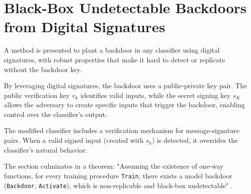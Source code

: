 \documentclass[
	fontsize=12pt,
	headings=small,
	parskip=quarter,
	bibliography=totoc,
	numbers=noenddot,       
	open=any,               
 	final                   
]{scrreprt}
\begin{document}
\section{Black-Box Undetectable Backdoors from Digital Signatures}
A method is presented to plant a backdoor in any classifier using digital signatures, with robust properties that make it hard to detect or replicate without the backdoor key.
\par By leveraging digital signatures, the backdoor uses a public-private key pair. The public verification key $v_k$ identifies valid inputs, while the secret signing key $s_K$ allows the adversary to create specific inputs that trigger the backdoor, enabling control over the classifier’s output.
\par The modified classifier includes a verification mechanism for message-signature pairs. When a valid signed input (created with $s_k$) is detected, it overrides the classifier’s natural behavior.
\par The section culminates in a theorem: "Assuming the existence of one-way functions, for every training procedure \texttt{Train}, there exists a model backdoor (\texttt{Backdoor}, \texttt{Activate}), which is non-replicable and black-box undetectable" \cite{goldwasser2022backdoors}.
\end{document}
